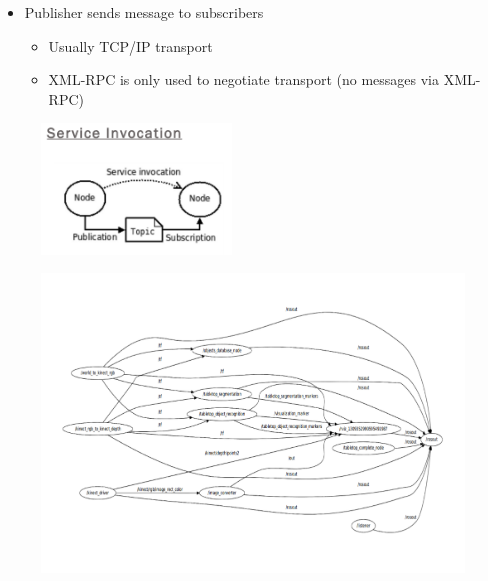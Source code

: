 \lyxframeend{}


\lyxframeend{}
\begin{itemize}
\item Publisher sends message to subscribers

\begin{itemize}
\item Usually TCP/IP transport
\item XML-RPC is only used to negotiate transport (no messages via XML-RPC)
\end{itemize}
\end{itemize}
\noindent \begin{center}
\begin{figure}[H]
\noindent \centering{}\includegraphics[width=0.45\textwidth]{images/ServiceInvocation}
\end{figure}

\par\end{center}


\lyxframeend{}


\lyxframeend{}

\noindent \begin{center}
\begin{figure}[H]
\noindent \centering{}\includegraphics[bb=40bp 0bp 800bp 530bp,clip,width=1\textwidth]{images/ros_rxgraph}
\end{figure}

\par\end{center}


